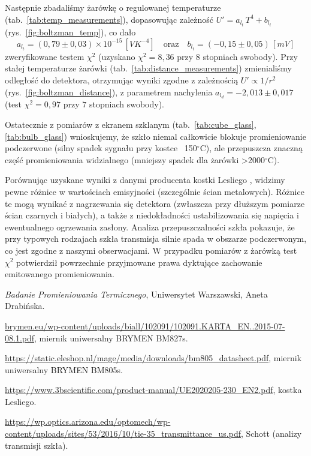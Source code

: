 \documentclass[12pt]{article}
\begin{document}
Następnie zbadaliśmy żarówkę o regulowanej temperaturze (tab.~\ref{tab:temp_measurements}), dopasowując zależność $U' = a_{l_t}\,T^4 + b_{l_t}$ (rys.~\ref{fig:boltzman_temp}), co dało 
\[
    a_{l_t} = (0{,}79 \pm 0{,}03) \times 10^{-15}\,[VK^{-4}] \quad \text{oraz} \quad b_{l_t} = (-0{,}15 \pm 0{,}05) \, [mV]
\]
zweryfikowane testem $\chi^2$ (uzyskano $\chi^2=8{,}36$ przy 8 stopniach swobody). Przy stałej temperaturze żarówki (tab.~\ref{tab:distance_measurements}) zmienialiśmy odległość do detektora, otrzymując wyniki zgodne z zależnością $U'\propto 1/r^2$ (rys.~\ref{fig:boltzman_distance}), z parametrem nachylenia $a_{l_d}=-2{,}013 \pm 0{,}017$ (test $\chi^2=0{,}97$ przy $7$ stopniach swobody). 

Ostatecznie z pomiarów z ekranem szklanym (tab.~\ref{tab:cube_glass}, \ref{tab:bulb_glass}) wnioskujemy, że szkło niemal całkowicie blokuje promieniowanie podczerwone (silny spadek sygnału przy kostce ~150$^\circ$C), ale przepuszcza znaczną część promieniowania widzialnego (mniejszy spadek dla żarówki >2000$^\circ$C).

Porównując uzyskane wyniki z danymi producenta kostki Lesliego \cite{cube}, widzimy pewne różnice w wartościach emisyjności (szczególnie ścian metalowych). Różnice te mogą wynikać z nagrzewania się detektora (zwłaszcza przy dłuższym pomiarze ścian czarnych i białych), a także z niedokładności ustabilizowania się napięcia i ewentualnego ogrzewania zasłony. 
Analiza przepuszczalności szkła \cite{glass} pokazuje, że przy typowych rodzajach szkła transmisja silnie spada w obszarze podczerwonym, co jest zgodne z naszymi obserwacjami.
W przypadku pomiarów z żarówką test $\chi^2$ potwierdził powrzechnie przyjmowane prawa dyktujące zachowanie emitowanego promieniowania.

\newpage
\begin{thebibliography}{5}

	\emph{Badanie Promieniowania Termicznego}, Uniwersytet Warszawski, Aneta Drabińska.

	\url{brymen.eu/wp-content/uploads/biall/102091/102091.KARTA_EN..2015-07-08.1.pdf}, miernik uniwersalny BRYMEN BM827s.

	\url{https://static.eleshop.nl/mage/media/downloads/bm805_datasheet.pdf}, miernik uniwersalny BRYMEN BM805s.

    \url{https://www.3bscientific.com/product-manual/UE2020205-230_EN2.pdf}, kostka Lesliego.

    \url{https://wp.optics.arizona.edu/optomech/wp-content/uploads/sites/53/2016/10/tie-35_transmittance_us.pdf}, Schott (analizy transmisji szkła).

\end{thebibliography}
\end{document}
